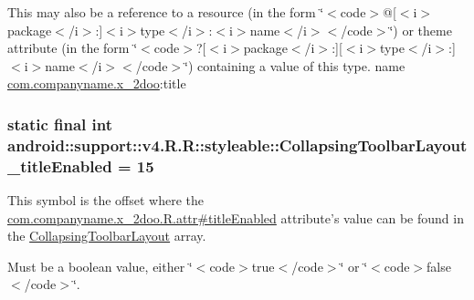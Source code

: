 This may also be a reference to a resource (in the form \char`\"{}$<$code$>$@\mbox{[}$<$i$>$package$<$/i$>$:\mbox{]}$<$i$>$type$<$/i$>$:$<$i$>$name$<$/i$>$$<$/code$>$\char`\"{}) or theme attribute (in the form \char`\"{}$<$code$>$?\mbox{[}$<$i$>$package$<$/i$>$:\mbox{]}\mbox{[}$<$i$>$type$<$/i$>$:\mbox{]}$<$i$>$name$<$/i$>$$<$/code$>$\char`\"{}) containing a value of this type.  name \hyperlink{namespacecom_1_1companyname_1_1x__2doo}{com.companyname.x\_\-2doo}:title \hypertarget{classandroid_1_1support_1_1v4_1_1_r_1_1styleable_37213d22bd11ccc3f3d3c343c9828a91}{
\subsubsection[{CollapsingToolbarLayout\_\-titleEnabled}]{\setlength{\rightskip}{0pt plus 5cm}static final int android::support::v4.R.R::styleable::CollapsingToolbarLayout\_\-titleEnabled = 15}}
\label{classandroid_1_1support_1_1v4_1_1_r_1_1styleable_37213d22bd11ccc3f3d3c343c9828a91}


This symbol is the offset where the \hyperlink{classcom_1_1companyname_1_1x__2doo_1_1_r_1_1attr_9e3b3c0bb26eb0c922eff68cc77593b9}{com.companyname.x\_\-2doo.R.attr\#titleEnabled} attribute's value can be found in the \hyperlink{classandroid_1_1support_1_1v4_1_1_r_1_1styleable_aa101903fcf4b45a3b7fee0a0abc5ea8}{CollapsingToolbarLayout} array.

Must be a boolean value, either \char`\"{}$<$code$>$true$<$/code$>$\char`\"{} or \char`\"{}$<$code$>$false$<$/code$>$\char`\"{}. 

